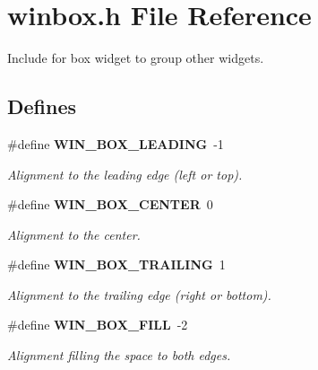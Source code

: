 \section{winbox.h File Reference}
\label{winbox_8h}
Include for box widget to group other widgets. 

\subsection*{Defines}
\begin{CompactItemize}
\item 
\#define {\bf WIN\_\-BOX\_\-LEADING}~-1\label{winbox_8h_a0}

\begin{CompactList}\small\item\em Alignment to the leading edge (left or top). \item\end{CompactList}\item 
\#define {\bf WIN\_\-BOX\_\-CENTER}~0\label{winbox_8h_a1}

\begin{CompactList}\small\item\em Alignment to the center. \item\end{CompactList}\item 
\#define {\bf WIN\_\-BOX\_\-TRAILING}~1\label{winbox_8h_a2}

\begin{CompactList}\small\item\em Alignment to the trailing edge (right or bottom). \item\end{CompactList}\item 
\#define {\bf WIN\_\-BOX\_\-FILL}~-2\label{winbox_8h_a3}

\begin{CompactList}\small\item\em Alignment filling the space to both edges. \item\end{CompactList}\end{CompactItemize}

